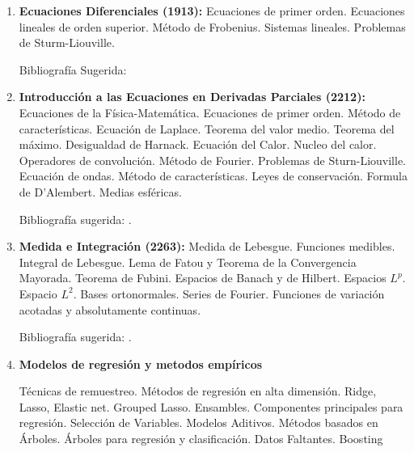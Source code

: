 \documentclass[a4paper, 12pt]{article}
\begin{document}
\begin{enumerate}
\item\textbf{Ecuaciones Diferenciales (1913):} Ecuaciones de primer
orden. Ecuaciones lineales de orden superior. Método de Frobenius. Sistemas lineales. Problemas de Sturm-Liouville.

Bibliografía Sugerida: \cite{ GeorgeFinlaySimmons487,WilliamE.Boyce496, MorrisW.Hirsch540,JorgeSotomayor513,BarbaraD.MacCluer515,RichardS.Palais519,GarrettBirkhoff526}


\item\textbf{Introducción a las Ecuaciones en Derivadas Parciales (2212):}  Ecuaciones de la Física-Matemática. Ecuaciones de primer orden. Método de características. Ecuación de Laplace. Teorema del valor medio. Teorema del máximo. Desigualdad de Harnack. Ecuación del Calor. Nucleo del calor. Operadores de convolución.  Método de Fourier. Problemas de Sturn-Liouville.  Ecuación de ondas. Método de características. Leyes de conservación. Formula de D'{}Alembert. Medias esféricas. 

Bibliografía sugerida: \cite{LawrenceC.Evans271,WalterCraig494,AlexanderKomech496,JulianFernandezBonder511,DavidBorthwick689,FritzJohn692,SandroSalsa693,AndrasVasy695,YehudaPinchover697,PavelDrabek698, AslakTveito699}.



\item\textbf{Medida e Integración (2263):}  Medida de Lebesgue. Funciones medibles.
Integral de
Lebesgue. Lema de Fatou y Teorema de la Convergencia Mayorada.
Teorema de Fubini. Espacios de Banach y de Hilbert. Espacios
$L^p$. Espacio  $L^2$. Bases ortonormales. Series de Fourier.
Funciones de variación acotadas y absolutamente continuas. 

Bibliografía sugerida: \cite{favazo, loeve, rudin, EliasM.Stein105,TerenceTao123,A.N.Kolmogorov682,DavidM.Bressoud121,wheeden2015measure}.



\item\textbf{Modelos de regresión y metodos empíricos}

 Técnicas de remuestreo. Métodos de regresión en alta dimensión. Ridge, Lasso, Elastic net. Grouped Lasso. Ensambles. Componentes principales para regresión. Selección de Variables. Modelos Aditivos. Métodos basados en Árboles. Árboles para regresión y clasificación. Datos Faltantes. Boosting




\end{enumerate}
\end{document}
